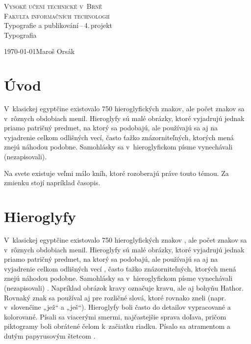 \documentclass[11pt,a4paper,titlepage]{article}
\begin{document}
\begin{titlepage}
 \begin{center}
    \LARGE\textsc{Vysoké učení technické v~Brně}\\
    \Large\textsc{Fakulta informačních technologií}\\

    \LARGE{Typografie a publikování\,--\,4.\,projekt}\\
    \Huge{Typografia}\\
 \end{center}
    {\Large\today \hfill Maroš Orsák }
\end{titlepage}

\section{Úvod}

V~klasickej egyptčine existovalo 750 hieroglyfických znakov, ale počet znakov sa v~rôznych obdobiach menil. Hieroglyfy sú malé obrázky, ktoré vyjadrujú jednak priamo patričný predmet, na ktorý sa podobajú, ale používajú sa aj na vyjadrenie celkom odlišných vecí, často ťažko znázorniteľných, ktorých mená znejú náhodou podobne. Samohlásky sa v~hieroglyfickom písme vynechávali (nezapisovali). \cite{Wiki_Hieroglyfy}

Na svete existuje veľmi málo kníh, ktoré rozoberajú práve touto témou. Za zmienku stojí napríklad časopis. \cite{Hieroglyfy_Casopis} 



\section{Hieroglyfy}
V~klasickej egyptčine existovalo 750 hieroglyfických znakov \cite{Anglicka_Kniha}, ale počet znakov sa v~rôznych obdobiach menil. Hieroglyfy sú malé obrázky, ktoré vyjadrujú jednak priamo patričný predmet, na ktorý sa podobajú, ale používajú sa aj na vyjadrenie celkom odlišných vecí \cite{Wiki_Egyptske_Pismo}, často ťažko znázorniteľných, ktorých mená znejú náhodou podobne. Samohlásky sa v~hieroglyfickom písme vynechávali (nezapisovali) \cite{Kniha}. Napríklad obrázok kravy označuje kravu, ale aj bohyňu Hathor. Rovnaký znak sa používal aj pre rozličné slová, ktoré rovnako zneli (napr. v~slovenčine „jež“ a „ješ“). Hieroglyfy boli často do detailov vypracované a kolorované. Písali sa viacerými smermi, najčastejšie sprava doľava, pričom piktogramy boli obrátené čelom k~začiatku riadku. Písalo sa atramentom a dutým papyrusovým štetcom \cite{citanie_hieroglyfov}.
\end{document}
